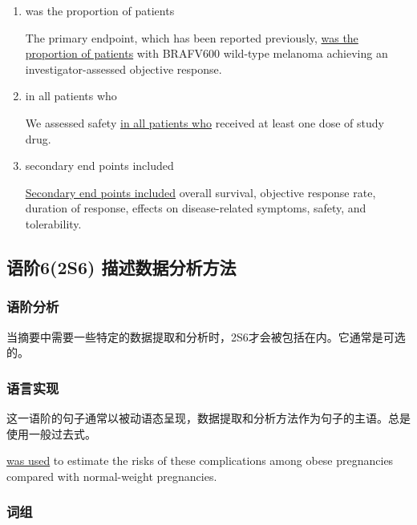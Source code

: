 \documentclass[a4paper]{ctexbook}
\begin{document}
\begin{enumerate}
      \item was the proportion of patients
      \begin{eg}{}
        The primary endpoint, which has been reported previously, \uline{was the proportion of patients} with BRAFV600 wild-type melanoma achieving an investigator-assessed objective response.
      \end{eg}

      \item in all patients who
      \begin{eg}{}
        We assessed safety \uline{in all patients who} received at least one dose of study drug. 
      \end{eg}

      \item secondary end points included
      \begin{eg}{}
        \uline{Secondary end points included} overall survival, objective response rate, duration of response, effects on disease-related symptoms, safety, and tolerability.
      \end{eg}
    \end{enumerate}

  \subsection{语阶6(2S6) 描述数据分析方法}

    \subsubsection{语阶分析}

    当摘要中需要一些特定的数据提取和分析时，2S6才会被包括在内。它通常是可选的。

    \subsubsection{语言实现}

    这一语阶的句子通常以被动语态呈现，数据提取和分析方法作为句子的主语。总是使用一般过去式。

    \begin{eg}{}
       \uline{was used} to estimate the risks of these complications among obese pregnancies compared with normal-weight pregnancies.    
    \end{eg}

    \subsubsection{词组}
\end{document}
